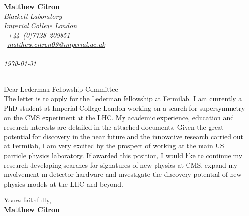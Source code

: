 \documentclass[12pt]{article}
\begin{document}
\sffamily   %
\hfill%
\begin{minipage}[t]{.6\textwidth}
\raggedleft%
{\bfseries Matthew Citron}\\[.35ex]
\small\itshape%
Blackett Laboratory\\ Imperial College London\\
\Telefon~+44~(0)7728~209851\\
\Letter~\href{mailto:matthew.citron09@imperial.ac.uk}{matthew.citron09@imperial.ac.uk}\\~\\

\today
\end{minipage}\\[1em]
%
\hfill %
Dear Lederman Fellowship Committee\\[1.5em]
%
The letter is to apply for the Lederman fellowship at Fermilab. I am currently a PhD 
student at Imperial College London working on a search for supersymmetry on the CMS
experiment at the LHC. My academic experience, education and research interests are
detailed in the attached documents. Given the great potential for discovery in the near future 
and the innovative research carried out at Fermilab, I am very excited by the prospect of 
working at the main US particle physics laboratory. If awarded this position, I 
would like to continue my research developing searches for signatures of new physics at CMS, 
expand my involvement in detector hardware and investigate the discovery potential of new physics models 
at the LHC and beyond. 

Yours faithfully,\\[2em] %
%
{\bfseries Matthew Citron}\\
%
\vfill%
\end{document}

